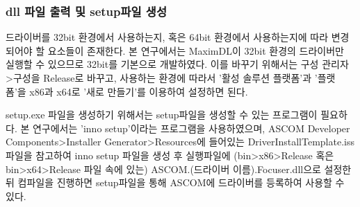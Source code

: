 \subsubsection{dll 파일 출력 및 setup파일 생성}
드라이버를 32bit 환경에서 사용하는지, 혹은 64bit 환경에서 사용하는지에 따라 변경되어야 할 요소들이 존재한다. 본 연구에서는 MaximDL이 32bit 환경의 드라이버만 실행할 수 있으므로 32bit를 기본으로 개발하였다. 이를 바꾸기 위해서는 구성 관리자>구성을 Release로 바꾸고, 사용하는 환경에 따라서 '활성 솔루션 플랫폼'과 '플랫폼'을 x86과 x64로 '새로 만들기'를 이용하여 설정하면 된다.

setup.exe 파일을 생성하기 위해서는 setup파일을 생성할 수 있는 프로그램이 필요하다. 본 연구에서는 'inno setup'이라는 프로그램을 사용하였으며, ASCOM Developer Components>Installer Generator>Resources에 들어있는 DriverInstallTemplate.iss파일을 참고하여 inno setup 파일을 생성 후 실행파일에 (bin>x86>Release 혹은 bin>x64>Release 파일 속에 있는) ASCOM.(드라이버 이름).Focuser.dll으로 설정한 뒤 컴파일을 진행하면 setup파일을 통해 ASCOM에 드라이버를 등록하여 사용할 수 있다.